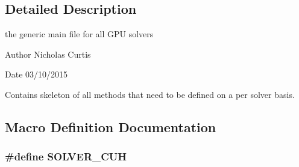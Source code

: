 \subsection{Detailed Description}
the generic main file for all G\+PU solvers 

\begin{DoxyAuthor}{Author}
Nicholas Curtis 
\end{DoxyAuthor}
\begin{DoxyDate}{Date}
03/10/2015
\end{DoxyDate}
Contains skeleton of all methods that need to be defined on a per solver basis. 

\subsection{Macro Definition Documentation}
\subsubsection[{\texorpdfstring{S\+O\+L\+V\+E\+R\+\_\+\+C\+UH}{SOLVER_CUH}}]{\setlength{\rightskip}{0pt plus 5cm}\#define S\+O\+L\+V\+E\+R\+\_\+\+C\+UH}\hypertarget{solver_8cuh_aeb5114b5c03776476cc8e7689face990}{}\label{solver_8cuh_aeb5114b5c03776476cc8e7689face990}
